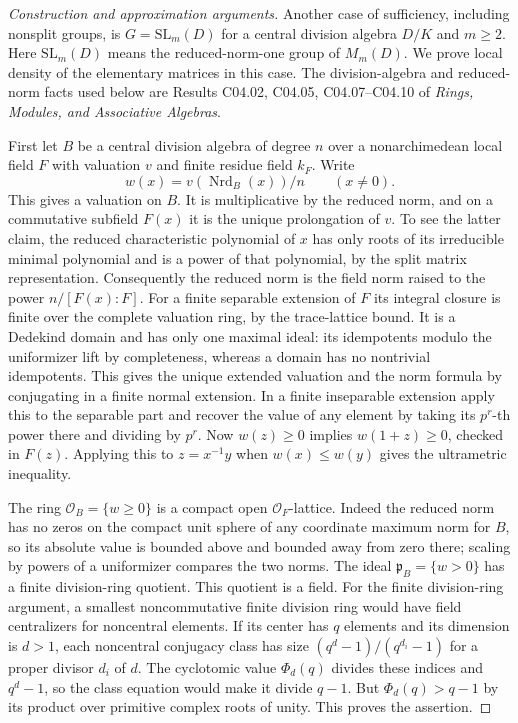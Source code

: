 \documentclass[11pt,a4paper,openany,oneside]{book}
\theoremstyle{resultstyle}
\theoremstyle{definition}
\numberwithin{equation}{chapter}
\newcommand{\SL}{\mathrm{SL}}
\begin{document}
\begin{proof}[Construction and approximation arguments]
Another case of sufficiency, including nonsplit groups, is
\(G=\SL_m(D)\) for a central division algebra \(D/K\)
and \(m\geq2\). Here \(\SL_m(D)\) means the reduced-norm-one
group of \(M_m(D)\). We prove local density of the elementary
matrices in this case. The division-algebra and reduced-norm
facts used below are Results C04.02, C04.05, C04.07--C04.10
of \emph{Rings, Modules, and Associative Algebras}.

First let \(B\) be a central division algebra of degree \(n\)
over a nonarchimedean local field \(F\) with valuation \(v\)
and finite residue field \(k_F\). Write
\[
 w(x)=v(\operatorname{Nrd}_B(x))/n
 \qquad(x\ne0).
\]
This gives a valuation on \(B\). It is multiplicative by the
reduced norm, and on a commutative subfield \(F(x)\) it is
the unique prolongation of \(v\). To see the latter claim,
the reduced characteristic polynomial of \(x\) has only
roots of its irreducible minimal polynomial and is a power
of that polynomial, by the split matrix representation.
Consequently the reduced norm is the field norm raised
to the power \(n/[F(x):F]\). For a finite separable extension
of \(F\) its integral closure is finite over the complete
valuation ring, by the trace-lattice bound. It is a
Dedekind domain and has only one maximal ideal: its
idempotents modulo the uniformizer lift by completeness,
whereas a domain has no nontrivial idempotents. This
gives the unique extended valuation and the norm formula
by conjugating in a finite normal extension. In a finite
inseparable extension apply this to the separable part
and recover the value of any element by taking its
\(p^r\)-th power there and dividing by \(p^r\).
Now \(w(z)\geq0\) implies \(w(1+z)\geq0\), checked in
\(F(z)\). Applying this to \(z=x^{-1}y\) when
\(w(x)\le w(y)\) gives the ultrametric inequality.

The ring \(\mathcal O_B=\{w\geq0\}\) is a compact open
\(\mathcal O_F\)-lattice. Indeed the reduced norm has no
zeros on the compact unit sphere of any coordinate
maximum norm for \(B\), so its absolute value is bounded
above and bounded away from zero there; scaling by
powers of a uniformizer compares the two norms.
The ideal \(\mathfrak p_B=\{w>0\}\) has a finite
division-ring quotient. This quotient is a field.
For the finite division-ring argument, a smallest
noncommutative finite division ring would have field
centralizers for noncentral elements. If its center
has \(q\) elements and its dimension is \(d>1\), each
noncentral conjugacy class has size
\((q^d-1)/(q^{d_i}-1)\) for a proper divisor \(d_i\) of \(d\).
The cyclotomic value \(\Phi_d(q)\) divides these indices
and \(q^d-1\), so the class equation would make it divide
\(q-1\). But \(\Phi_d(q)>q-1\) by its product over
primitive complex roots of unity. This proves the assertion.


\end{proof}
\end{document}

